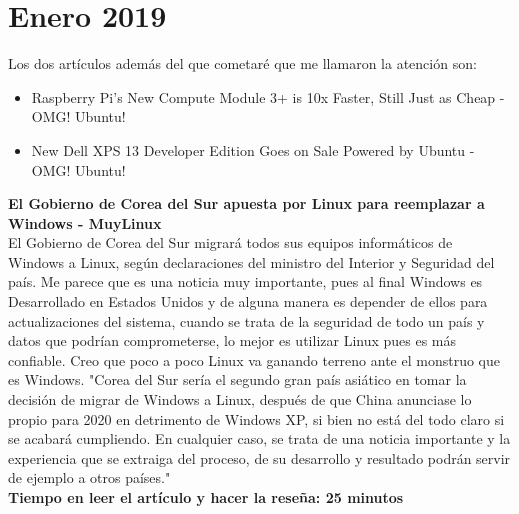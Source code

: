 \documentclass[a4paper, 11pt, oneside]{article}
\begin{document}
\section*{Enero 2019}
Los dos artículos además del que cometaré que me llamaron la atención son:
\begin{itemize}
    \item Raspberry Pi’s New Compute Module 3+ is 10x Faster, Still Just as Cheap - OMG! Ubuntu!
    \item New Dell XPS 13 Developer Edition Goes on Sale Powered by Ubuntu - OMG! Ubuntu!
\end{itemize}
\textbf{El Gobierno de Corea del Sur apuesta por Linux para reemplazar a Windows - MuyLinux}\\
El Gobierno de Corea del Sur migrará todos sus equipos informáticos de Windows a Linux, según declaraciones del ministro del Interior y Seguridad del país. Me parece que es una noticia muy importante, pues al final Windows es Desarrollado en Estados Unidos y de alguna manera es depender de ellos para actualizaciones del sistema, cuando se trata de la seguridad de todo un país y datos que podrían comprometerse, lo mejor es utilizar Linux pues es más confiable. Creo que poco a poco Linux va ganando terreno ante el monstruo que es Windows. "Corea del Sur sería el segundo gran país asiático en tomar la decisión de migrar de Windows a Linux, después de que China anunciase lo propio para 2020 en detrimento de Windows XP, si bien no está del todo claro si se acabará cumpliendo. En cualquier caso, se trata de una noticia importante y la experiencia que se extraiga del proceso, de su desarrollo y resultado podrán servir de ejemplo a otros países."\\
\textbf{Tiempo en leer el artículo y hacer la reseña: 25 minutos}

\end{document}
